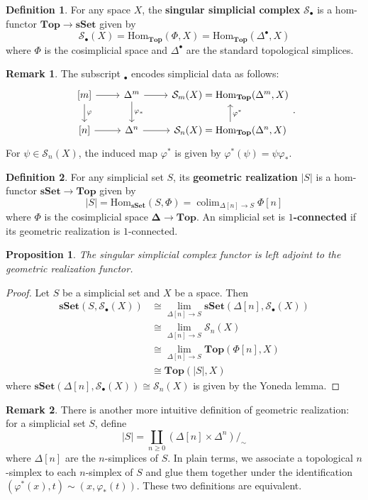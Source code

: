 \documentclass[psamsfonts]{amsart}
\newtheorem{prop}{Proposition}[section]
\theoremstyle{definition}
\newtheorem{defn}{Definition}[section]
\newtheorem{rem}{Remark}[section]
\newcommand{\Top}{\mathbf{Top}}
\newcommand{\sSet}{\mathbf{sSet}}
\newcommand{\Hom}{\mathrm{Hom}}
\DeclareMathOperator{\colim}{colim}
\numberwithin{equation}{section}
\begin{document}
\begin{defn}
For any space $X$, the \textbf{singular simplicial complex} $\mathcal{S}_\bullet$ is a hom-functor $\Top\to\sSet$ given by
\[\mathcal{S}_\bullet(X)=\Hom_\Top(\Phi,X)=\Hom_\Top(\Delta^\bullet,X)\]
where $\Phi$ is the cosimplicial space and $\Delta^\bullet$ are the standard topological simplices.
\end{defn}

\begin{rem}
The subscript $_\bullet$ encodes simplicial data as follows:
\[\begin{tikzcd}
{[m]}\arrow[d,"\varphi"]\arrow[r]&\Delta^m\arrow[r]\arrow[d,"\varphi_\ast"]&\mathcal{S}_m(X)=\Hom_{\Top}(\Delta^m,X)\\
{[n]}\arrow[r]&\Delta^n\arrow[r]&\mathcal{S}_n(X)=\Hom_{\Top}(\Delta^n,X)\arrow[u,"\varphi^\ast"']
\end{tikzcd}.\]
For $\psi\in\mathcal{S}_n(X)$, the induced map $\varphi^\ast$ is given by $\varphi^\ast(\psi)=\psi\varphi_\ast$.
\end{rem}

\begin{defn}
For any simplicial set $S$, its \textbf{geometric realization} $|S|$ is a hom-functor $\sSet\to\Top$ given by
\[|S|=\Hom_\sSet(S,\Phi)=\colim_{\Delta[n]\to S}\Phi[n]\]
where $\Phi$ is the cosimplicial space $\mathbf{\Delta}\to\Top$. An simplicial set is \textbf{$1$-connected} if its geometric realization is $1$-connected.
\end{defn}

\begin{prop}
The singular simplicial complex functor is left adjoint to the geometric realization functor.
\end{prop}
\begin{proof}
Let $S$ be a simplicial set and $X$ be a space. Then
\begin{align*}
\sSet(S,\mathcal{S}_\bullet(X))&\cong\textstyle{\lim_{\Delta[n]\to S}\sSet(\Delta[n],\mathcal{S}_\bullet(X))}\\
&\cong\textstyle{\lim_{\Delta[n]\to S}\mathcal{S}_n(X)}\\
&\cong\textstyle{\lim_{\Delta[n]\to S}\Top(\Phi[n],X)}\\
&\cong\Top(|S|,X)
\end{align*}
where $\sSet(\Delta[n],\mathcal{S}_\bullet(X))\cong\mathcal{S}_n(X)$ is given by the Yoneda lemma.
\end{proof}

\begin{rem}
There is another more intuitive definition of geometric realization: for a simplicial set $S$, define
\[|S|=\coprod_{n\geq0}(\Delta[n]\times\Delta^n)/_{\sim}\]
where $\Delta[n]$ are the $n$-simplices of $S$. In plain terms, we associate a topological $n$-simplex to each $n$-simplex of $S$ and glue them together under the identification $(\varphi^\ast(x),t)\sim(x,\varphi_\ast(t))$. These two definitions are equivalent.
\end{rem}
\end{document}
